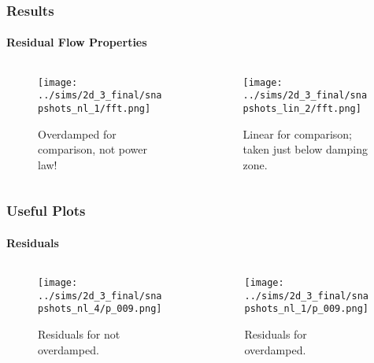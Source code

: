 \documentclass[dvipsnames]{beamer}
\begin{document}
\begin{frame}
    \frametitle{Results}
    \framesubtitle{Residual Flow Properties}

    \begin{columns}
        \begin{column}{0.5\textwidth}
            \begin{figure}[t]
                \centering
                \texttt{[image: ../sims/2d\_3\_final/snapshots\_nl\_1/fft.png]}
                \caption{Overdamped for comparison, not power law!}
            \end{figure}
        \end{column}
        \begin{column}{0.5\textwidth}
            \begin{figure}[t]
                \centering
                \texttt{[image: ../sims/2d\_3\_final/snapshots\_lin\_2/fft.png]}
                \caption{Linear for comparison; taken just below damping zone.}
            \end{figure}
        \end{column}
    \end{columns}
\end{frame}

\begin{frame}
    \frametitle{Useful Plots}
    \framesubtitle{Residuals}

    \begin{columns}
        \begin{column}{0.5\textwidth}
            \begin{figure}[t]
                \centering
                \texttt{[image: ../sims/2d\_3\_final/snapshots\_nl\_4/p\_009.png]}
                \caption{Residuals for not overdamped. }
            \end{figure}
        \end{column}
        \begin{column}{0.5\textwidth}
            \begin{figure}[t]
                \centering
                \texttt{[image: ../sims/2d\_3\_final/snapshots\_nl\_1/p\_009.png]}
                \caption{Residuals for overdamped.}
            \end{figure}
        \end{column}
    \end{columns}
\end{frame}
\end{document}
